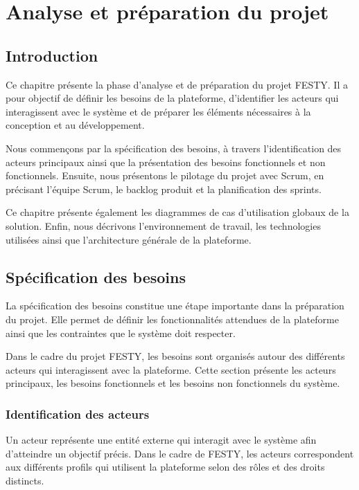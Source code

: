 ﻿%

\chapter{Analyse et préparation du projet}
\label{chap:analyse-preparation-projet}


\section{Introduction}


Ce chapitre présente la phase d’analyse et de préparation du projet FESTY. Il a pour objectif de définir les besoins de la plateforme, d’identifier les acteurs qui interagissent avec le système et de préparer les éléments nécessaires à la conception et au développement.


Nous commençons par la spécification des besoins, à travers l’identification des acteurs principaux ainsi que la présentation des besoins fonctionnels et non fonctionnels. Ensuite, nous présentons le pilotage du projet avec Scrum, en précisant l’équipe Scrum, le backlog produit et la planification des sprints.


Ce chapitre présente également les diagrammes de cas d’utilisation globaux de la solution. Enfin, nous décrivons l’environnement de travail, les technologies utilisées ainsi que l’architecture générale de la plateforme.


\section{Spécification des besoins}


La spécification des besoins constitue une étape importante dans la préparation du projet. Elle permet de définir les fonctionnalités attendues de la plateforme ainsi que les contraintes que le système doit respecter.


Dans le cadre du projet FESTY, les besoins sont organisés autour des différents acteurs qui interagissent avec la plateforme. Cette section présente les acteurs principaux, les besoins fonctionnels et les besoins non fonctionnels du système.


\subsection{Identification des acteurs}


Un acteur représente une entité externe qui interagit avec le système afin d’atteindre un objectif précis. Dans le cadre de FESTY, les acteurs correspondent aux différents profils qui utilisent la plateforme selon des rôles et des droits distincts.


